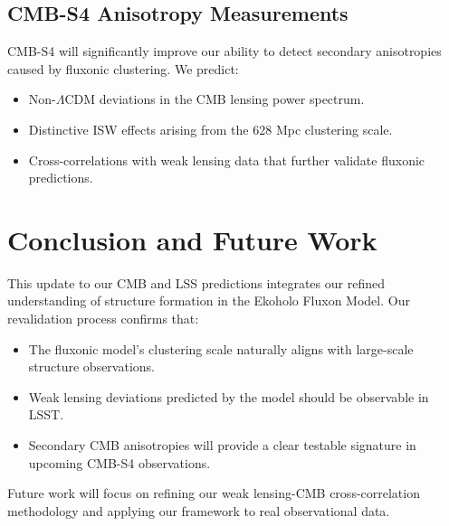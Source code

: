 \documentclass{article}
\begin{document}
\subsection{CMB-S4 Anisotropy Measurements}
CMB-S4 will significantly improve our ability to detect secondary anisotropies caused by fluxonic clustering. We predict:
\begin{itemize}
    \item Non-\(\Lambda\)CDM deviations in the CMB lensing power spectrum.
    \item Distinctive ISW effects arising from the 628 Mpc clustering scale.
    \item Cross-correlations with weak lensing data that further validate fluxonic predictions.
\end{itemize}

\section{Conclusion and Future Work}
This update to our CMB and LSS predictions integrates our refined understanding of structure formation in the Ekoholo Fluxon Model. Our revalidation process confirms that:
\begin{itemize}
    \item The fluxonic model’s clustering scale naturally aligns with large-scale structure observations.
    \item Weak lensing deviations predicted by the model should be observable in LSST.
    \item Secondary CMB anisotropies will provide a clear testable signature in upcoming CMB-S4 observations.
\end{itemize}
Future work will focus on refining our weak lensing-CMB cross-correlation methodology and applying our framework to real observational data.
\end{document}
